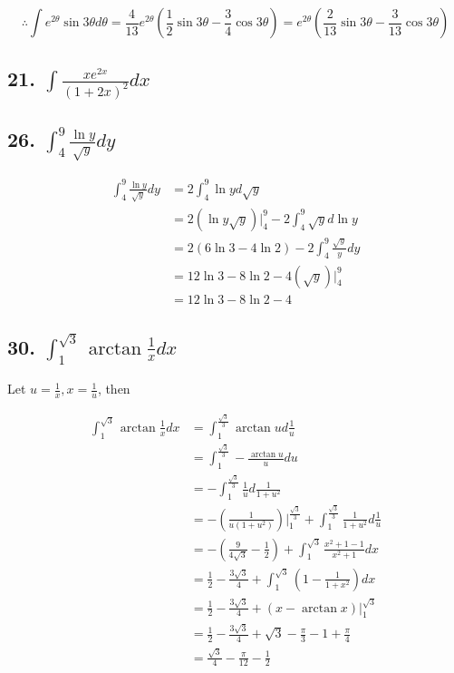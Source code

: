 \documentclass{article}
\begin{document}
    $$\therefore \int e^{2\theta} \sin 3\theta d\theta = \frac{4}{13}e^{2\theta}(\frac 1 2 \sin 3\theta - \frac 3 4 \cos 3\theta) = e^{2\theta}(\frac{2}{13} \sin 3\theta - \frac{3}{13} \cos 3\theta)$$

    \subsection*{21. $\int \frac{xe^{2x}}{(1 + 2x)^2} dx$}



    \subsection*{26. $\int_4^9 \frac{\ln y}{\sqrt y} dy$}



    $$\begin{aligned}
        \int_4^9 \frac{\ln y}{\sqrt y} dy &= 2\int_4^9 \ln y d\sqrt y \\
        &= 2(\ln y \sqrt y) \biggl |_4^9 - 2 \int_4^9 \sqrt{y} d\ln y \\
        &= 2(6\ln 3 - 4\ln 2) - 2 \int_4^9 \frac{\sqrt{y}}{y} dy \\
        &= 12\ln 3 - 8\ln 2 - 4(\sqrt y) \biggl |_4^9 \\
        &= 12\ln 3 - 8\ln 2 - 4
    \end{aligned}$$

    \subsection*{30. $\int_1^{\sqrt 3} \arctan\frac 1 x dx$}

    Let $u = \frac 1 x, x = \frac 1 u$, then 
    
    $$\begin{aligned}
        \int_1^{\sqrt 3} \arctan \frac 1 x dx &= \int_1^{\frac{\sqrt{3}}{3}} \arctan u d\frac 1 u \\
        &= \int_1^{\frac{\sqrt 3}{3}} -\frac{\arctan u}{u} du \\
        &= -\int_1^{\frac{\sqrt 3}{3}} \frac{1}{u} d \frac{1}{1 + u^2} \\
        &= -(\frac{1}{u(1 + u^2)})\biggl |_1^{\frac{\sqrt 3}{3}} + \int_1^{\frac{\sqrt 3}{3}} \frac{1}{1 + u^2} d\frac 1 u \\
        &= -(\frac{9}{4\sqrt 3} - \frac 1 2) + \int_1^{\sqrt 3} \frac{x^2 + 1 - 1}{x^2 + 1} dx \\
        &= \frac 1 2 - \frac{3\sqrt 3}{4} + \int_1^{\sqrt 3}(1 - \frac{1}{1 + x^2}) dx \\
        &= \frac 1 2 - \frac{3 \sqrt 3}{4} + (x - \arctan x) \biggl |_1^{\sqrt 3} \\
        &= \frac 1 2 - \frac{3\sqrt 3}{4} + \sqrt 3 - \frac \pi 3 - 1 + \frac \pi 4 \\
        &= \frac{\sqrt 3}{4} - \frac{\pi}{12} - \frac 1 2
    \end{aligned}$$
\end{document}
